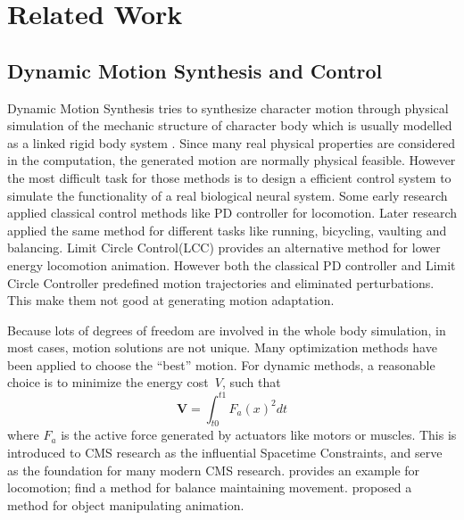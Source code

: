 \section{Related Work}

\subsection{Dynamic Motion Synthesis and Control}
Dynamic Motion Synthesis  tries to synthesize character motion through physical simulation of the mechanic structure of character body which is usually modelled as a linked rigid body system \citep{Baraff1994,Mirtich1996,Stewart2000}. Since many real physical properties are considered in the computation, the generated motion are normally physical feasible. However the most difficult task for those methods is to design a efficient control system to simulate the functionality of a real biological neural system. Some early research applied classical control methods like PD controller \citep{Raibert1991} for locomotion. Later research \citep{Hodgins1995} applied the same method for different tasks like running, bicycling, vaulting and balancing. Limit Circle Control(LCC) \citep{Laszlo1996} provides an alternative method for lower energy locomotion animation. However both the classical PD controller and Limit Circle Controller predefined motion trajectories and eliminated perturbations. This make them not good at generating motion adaptation.

Because lots of degrees of freedom are involved in the whole body simulation, in most cases, motion solutions are not unique. Many optimization methods have been applied to choose the ``best'' motion. For dynamic methods, a reasonable choice is to minimize the energy cost~$V$, such that 
\[
\textbf{V}=\int_{t0}^{t1}F_{a}(x)^2dt
\]
where $F_{a}$ is the active force generated by actuators like motors or muscles. This is introduced to CMS research as the influential Spacetime Constraints\citep{Witkin1988}, and serve as the foundation for many modern CMS research. \citet{Jain2009} provides an example for locomotion;  \citet{BalanceControl} find a method for balance maintaining movement. \citet{Liu2009} proposed a method for object manipulating animation.

